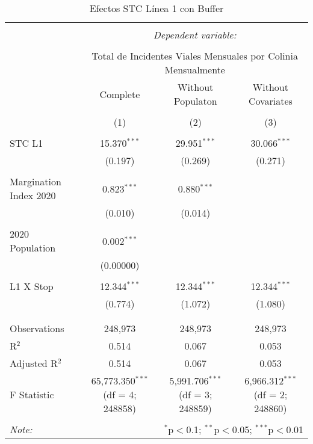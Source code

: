 
\begin{table}[!htbp] \centering 
  \caption{Efectos STC Línea 1 con Buffer} 
  \label{} 
\begin{tabular}{@{\extracolsep{5pt}}lccc} 
\\[-1.8ex]\hline 
\hline \\[-1.8ex] 
 & \multicolumn{3}{c}{\textit{Dependent variable:}} \\ 
\cline{2-4} 
\\[-1.8ex] & \multicolumn{3}{c}{Total de Incidentes Viales Mensuales por Colinia Mensualmente} \\ 
 & Complete & Without Populaton & Without Covariates \\ 
\\[-1.8ex] & (1) & (2) & (3)\\ 
\hline \\[-1.8ex] 
 STC L1 & 15.370$^{***}$ & 29.951$^{***}$ & 30.066$^{***}$ \\ 
  & (0.197) & (0.269) & (0.271) \\ 
  & & & \\ 
 Margination Index 2020 & 0.823$^{***}$ & 0.880$^{***}$ &  \\ 
  & (0.010) & (0.014) &  \\ 
  & & & \\ 
 2020 Population & 0.002$^{***}$ &  &  \\ 
  & (0.00000) &  &  \\ 
  & & & \\ 
 L1 X Stop & 12.344$^{***}$ & 12.344$^{***}$ & 12.344$^{***}$ \\ 
  & (0.774) & (1.072) & (1.080) \\ 
  & & & \\ 
\hline \\[-1.8ex] 
Observations & 248,973 & 248,973 & 248,973 \\ 
R$^{2}$ & 0.514 & 0.067 & 0.053 \\ 
Adjusted R$^{2}$ & 0.514 & 0.067 & 0.053 \\ 
F Statistic & 65,773.350$^{***}$ (df = 4; 248858) & 5,991.706$^{***}$ (df = 3; 248859) & 6,966.312$^{***}$ (df = 2; 248860) \\ 
\hline 
\hline \\[-1.8ex] 
\textit{Note:}  & \multicolumn{3}{r}{$^{*}$p$<$0.1; $^{**}$p$<$0.05; $^{***}$p$<$0.01} \\ 
\end{tabular} 
\end{table} 
